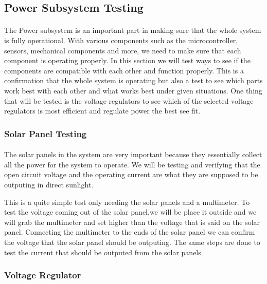\subsection{Power Subsystem Testing}
\label{sec:power_subsystem_testing}
\paragraph{}The Power subsystem is an important part in making sure that the whole system is fully operational. With various components such as the microcontroller, sensors, mechanical components and more, we need to make sure that each component is operating properly. In this section we will test ways to see if the components are compatible with each other and function properly. This is a confirmation that the whole system is operating but also a test to see which parts work best with each other and what works best under given situations. One thing that will be tested is the voltage regulators to see which of the selected voltage regulators is most efficient and regulate power the best see fit.	\par
\subsubsection{Solar Panel Testing}
\paragraph{}The solar panels in the system are very important because they essentially collect all the power for the system to operate. We will be testing and verifying that the open circuit voltage and the operating current are what they are supposed to be outputing in direct sunlight. \par
This is a quite simple test only needing the solar panels and a multimeter. To test the voltage coming out of the solar panel,we will be place it outside and we will grab the multimeter and set higher than the voltage that is said on the solar panel. Connecting the multimeter to the ends of the solar panel we can confirm the voltage that the solar panel should be outputing. The same steps are done to test the current that should be outputed from the solar panels.\par
\subsubsection{Voltage Regulator}
